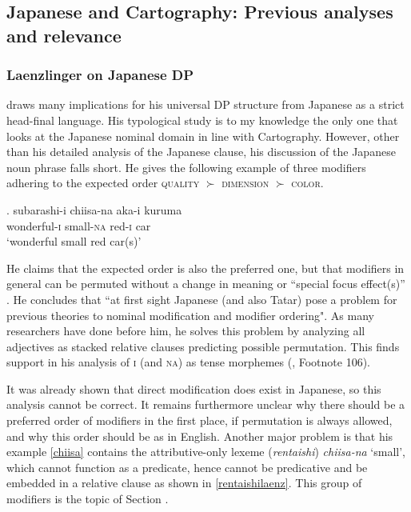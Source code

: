 \subsection{Japanese and Cartography: Previous analyses and relevance}

\subsubsection{Laenzlinger on Japanese DP} \label{Laenz}

\citet{laenzlinger:2010:cp, laenzlinger:2011:elements} draws many implications for his universal DP structure from Japanese as a strict head-final language. His typological study is to my knowledge the only one that looks at the Japanese nominal domain in line with Cartography. However, other than his detailed analysis of the Japanese clause, his discussion of the Japanese noun phrase falls short. He gives the following example of three modifiers adhering to the expected order \textsc{quality} $\succ$ \textsc{dimension} $\succ$ \textsc{color}.

\exg. \label{chiisa}subarashi-i chiisa-na aka-i kuruma \\
wonderful-\textsc{i} small-\textsc{na} red-\textsc{i} car\\
`wonderful small red car(s)’ \hfill \citep[189]{laenzlinger:2011:elements}

He claims that the expected order is also the preferred one, but that modifiers in general can be permuted without a change in meaning or ``special focus effect(s)” \citep[190]{laenzlinger:2011:elements}. He concludes that ``at first sight Japanese (and also  Tatar) pose a problem for previous theories to nominal modification and modifier ordering". As many researchers have done before him, he solves this problem by analyzing all adjectives as stacked relative clauses predicting possible permutation. This finds support in his analysis of \textsc{i} (and \textsc{na}) as tense morphemes (\citealt[191]{laenzlinger:2011:elements}, Footnote 106).

It was already shown that direct modification does exist in Japanese, so this analysis cannot be correct. It remains furthermore unclear why there should be a preferred order of modifiers in the first place, if permutation is always allowed, and why this order should be as in English. Another major problem is that his example \ref{chiisa} contains the attributive-only lexeme (\textit{rentaishi}) \textit{chiisa-na} `small’, which cannot function as a predicate, hence cannot be predicative and be embedded in a relative clause as shown in \ref{rentaishilaenz}. This group of modifiers is the topic of Section .

